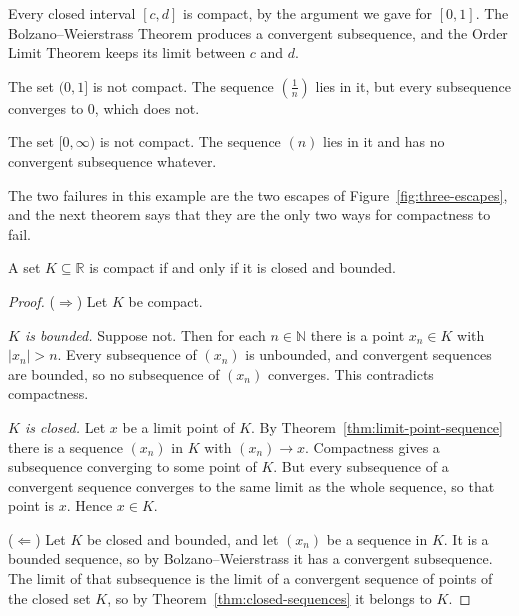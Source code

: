 \begin{example}
Every closed interval $[c,d]$ is compact, by the argument we gave for $[0,1]$.  The Bolzano--Weierstrass Theorem produces a convergent subsequence, and the Order Limit Theorem keeps its limit between $c$ and $d$.

The set $(0,1]$ is not compact.  The sequence $\left(\frac1n\right)$ lies in it, but every subsequence converges to $0$, which does not.

The set $[0,\infty)$ is not compact.  The sequence $(n)$ lies in it and has no convergent subsequence whatever.
\end{example}

The two failures in this example are the two escapes of Figure~\ref{fig:three-escapes}, and the next theorem says that they are the only two ways for compactness to fail.

\begin{theorem}\label{thm:closed-bounded}
A set $K \subseteq \mathbb{R}$ is compact if and only if it is closed and bounded.
\end{theorem}

\begin{proof}
($\Rightarrow$)  Let $K$ be compact.

\emph{$K$ is bounded.}  Suppose not.  Then for each $n \in \mathbb{N}$ there is a point $x_n \in K$ with $|x_n| > n$.  Every subsequence of $(x_n)$ is unbounded, and convergent sequences are bounded, so no subsequence of $(x_n)$ converges.  This contradicts compactness.

\emph{$K$ is closed.}  Let $x$ be a limit point of $K$.  By Theorem~\ref{thm:limit-point-sequence} there is a sequence $(x_n)$ in $K$ with $(x_n) \to x$.  Compactness gives a subsequence converging to some point of $K$.  But every subsequence of a convergent sequence converges to the same limit as the whole sequence, so that point is $x$.  Hence $x \in K$.

($\Leftarrow$)  Let $K$ be closed and bounded, and let $(x_n)$ be a sequence in $K$.  It is a bounded sequence, so by Bolzano--Weierstrass it has a convergent subsequence.  The limit of that subsequence is the limit of a convergent sequence of points of the closed set $K$, so by Theorem~\ref{thm:closed-sequences} it belongs to $K$.
\end{proof}


